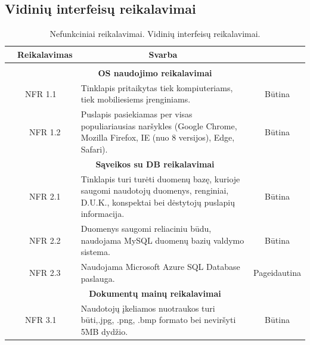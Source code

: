\documentclass{VUMIFPSkursinis}
\begin{document}
\subsection{Vidinių interfeisų reikalavimai}
	\begin{table}[H]
	\caption{Nefunkciniai reikalavimai. Vidinių interfeisų reikalavimai.}
	\begin{tabular}{|p{1cm}|p{1cm}|p{}|p{}|}
	\hline 
\rowcolor{gray!50}
		\multicolumn{2}{|c|}{{\bfseries Kodas}}&
		\multicolumn{1}{c|}{{\bfseries Reikalavimas}}&
		\multicolumn{1}{c|}{{\bfseries Svarba}}\\
\hline
\rowcolor{lightgray}
\multicolumn{4}{|c|}{Vidinių interfeisų reikalavimai}\\		

\hline
\multicolumn{4}{|c|}{\bfseries OS naudojimo reikalavimai}\\	

\hline
	\multicolumn{2}{|c|}{NFR 1.1}&
	{Tinklapis pritaikytas tiek kompiuteriams, tiek mobiliesiems įrenginiams.
}&		
	\multicolumn{1}{c|}{Būtina}\\
\hline
	\multicolumn{1}{|c}{}&
	\multicolumn{1}{c|}{NFR 1.2}&
	{Puslapis pasiekiamas per visas populiariausias naršykles
(Google Chrome, Mozilla Firefox, IE (nuo 8 versijos), Edge, Safari).
}&		
	\multicolumn{1}{c|}{Būtina}\\

	\hline
\multicolumn{4}{|c|}{\bfseries Sąveikos su DB reikalavimai}\\		
				
	\hline
		\multicolumn{1}{|c}{}&
		\multicolumn{1}{c|}{NFR 2.1}&
		{Tinklapis turi turėti duomenų bazę, kurioje saugomi naudotojų duomenys, renginiai, D.U.K., konspektai bei dėstytojų puslapių informacija.
		}&
		\multicolumn{1}{c|}{Būtina}\\	
\hline		
		\multicolumn{1}{|c}{}&
		\multicolumn{1}{c|}{NFR 2.2}&
		{Duomenys saugomi reliaciniu būdu, naudojama MySQL
duomenų bazių valdymo sistema.
		}&
		\multicolumn{1}{c|}{Būtina}\\		
		
		\hline		
		\multicolumn{1}{|c}{}&
		\multicolumn{1}{c|}{NFR 2.3}&
		{Naudojama Microsoft Azure SQL Database paslauga.
		}&
		\multicolumn{1}{c|}{Pageidautina}\\	
		
		
\hline
\multicolumn{4}{|c|}{\bfseries Dokumentų mainų reikalavimai}\\		
		
	\hline
		\multicolumn{2}{|c|}{NFR 3.1}&
		{Naudotojų įkeliamos nuotraukos turi būti,.jpg, .png, .bmp formato bei neviršyti 5MB dydžio.
		}&
		\multicolumn{1}{c|}{Būtina}\\
		

\end{tabular}
\end{table}
\end{document}
